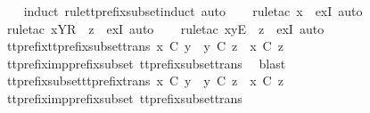 %
\isadelimproof
\ \ %
\endisadelimproof
%
\isatagproof
{}\isamarkupfalse%
\ {\isacharparenleft}induct\ rule{\isacharcolon}tt{\isacharunderscore}prefix{\isacharunderscore}subset{\isachardot}induct{\isacharcomma}\ auto{\isacharparenright}\isanewline
\ \ \isamarkupfalse%
\ {\isacharparenleft}rule{\isacharunderscore}tac\ x{\isacharequal}{\isachardoublequoteopen}{\isacharbrackleft}{\isacharbrackright}{\isachardoublequoteclose}\ \ exI{\isacharcomma}\ auto{\isacharparenright}\isanewline
\ \ \isamarkupfalse%
\ {\isacharparenleft}rule{\isacharunderscore}tac\ x{\isacharequal}{\isachardoublequoteopen}{\isacharbrackleft}Y{\isacharbrackright}\isactrlsub R\ {\isacharhash}\ z{\isachardoublequoteclose}\ \ exI{\isacharcomma}\ auto{\isacharparenright}\isanewline
\ \ \isamarkupfalse%
\ {\isacharparenleft}rule{\isacharunderscore}tac\ x{\isacharequal}{\isachardoublequoteopen}{\isacharbrackleft}y{\isacharbrackright}\isactrlsub E\ {\isacharhash}\ z{\isachardoublequoteclose}\ \ exI{\isacharcomma}\ auto{\isacharparenright}\isanewline
\ \ \isamarkupfalse%
%
\endisatagproof
{\isafoldproof}%
%
\isadelimproof
\isanewline
%
\endisadelimproof
\isanewline
{}\isamarkupfalse%
\ tt{\isacharunderscore}prefix{\isacharunderscore}tt{\isacharunderscore}prefix{\isacharunderscore}subset{\isacharunderscore}trans{\isacharcolon}\ {\isachardoublequoteopen}x\ {\isasymle}\isactrlsub C\ y\ {\isasymLongrightarrow}\ y\ {\isasymlesssim}\isactrlsub C\ z\ {\isasymLongrightarrow}\ x\ {\isasymlesssim}\isactrlsub C\ z{\isachardoublequoteclose}\isanewline
%
\isadelimproof
\ \ %
\endisadelimproof
%
\isatagproof
{}\isamarkupfalse%
\ tt{\isacharunderscore}prefix{\isacharunderscore}imp{\isacharunderscore}prefix{\isacharunderscore}subset\ tt{\isacharunderscore}prefix{\isacharunderscore}subset{\isacharunderscore}trans\ \isamarkupfalse%
\ blast%
\endisatagproof
{\isafoldproof}%
%
\isadelimproof
\isanewline
%
\endisadelimproof
\ \isanewline
{}\isamarkupfalse%
\ tt{\isacharunderscore}prefix{\isacharunderscore}subset{\isacharunderscore}tt{\isacharunderscore}prefix{\isacharunderscore}trans{\isacharcolon}\ {\isachardoublequoteopen}x\ {\isasymlesssim}\isactrlsub C\ y\ {\isasymLongrightarrow}\ y\ {\isasymle}\isactrlsub C\ z\ {\isasymLongrightarrow}\ x\ {\isasymlesssim}\isactrlsub C\ z{\isachardoublequoteclose}\isanewline
%
\isadelimproof
\ \ %
\endisadelimproof
%
\isatagproof
{}\isamarkupfalse%
\ tt{\isacharunderscore}prefix{\isacharunderscore}imp{\isacharunderscore}prefix{\isacharunderscore}subset\ tt{\isacharunderscore}prefix{\isacharunderscore}subset{\isacharunderscore}trans\ \isamarkupfalse%
